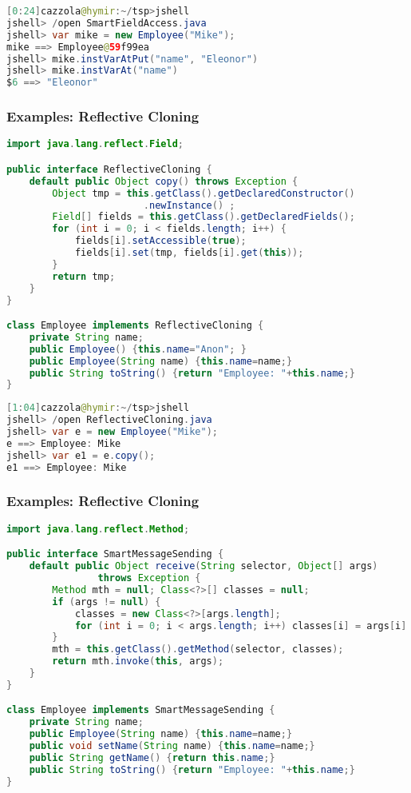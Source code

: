 \begin{lstlisting}[language=Java]
[0:24]cazzola@hymir:~/tsp>jshell
jshell> /open SmartFieldAccess.java
jshell> var mike = new Employee("Mike");
mike ==> Employee@59f99ea
jshell> mike.instVarAtPut("name", "Eleonor")
jshell> mike.instVarAt("name")
$6 ==> "Eleonor"
\end{lstlisting}

\subsubsection{Examples: Reflective Cloning}

\begin{lstlisting}[language=Java]
import java.lang.reflect.Field;

public interface ReflectiveCloning {
	default public Object copy() throws Exception {
		Object tmp = this.getClass().getDeclaredConstructor()
						.newInstance() ;
		Field[] fields = this.getClass().getDeclaredFields();
		for (int i = 0; i < fields.length; i++) {
			fields[i].setAccessible(true);
			fields[i].set(tmp, fields[i].get(this));
		}
		return tmp;
	}
}

class Employee implements ReflectiveCloning {
	private String name;
	public Employee() {this.name="Anon"; }
	public Employee(String name) {this.name=name;}
	public String toString() {return "Employee: "+this.name;}
}
\end{lstlisting}

\begin{lstlisting}[language=Java]
[1:04]cazzola@hymir:~/tsp>jshell
jshell> /open ReflectiveCloning.java
jshell> var e = new Employee("Mike");
e ==> Employee: Mike
jshell> var e1 = e.copy();
e1 ==> Employee: Mike
\end{lstlisting}

\subsubsection{Examples: Reflective Cloning}

\begin{lstlisting}[language=Java]
import java.lang.reflect.Method;

public interface SmartMessageSending {
	default public Object receive(String selector, Object[] args)
				throws Exception {
		Method mth = null; Class<?>[] classes = null;
		if (args != null) {
			classes = new Class<?>[args.length];
			for (int i = 0; i < args.length; i++) classes[i] = args[i].getClass();
		}
		mth = this.getClass().getMethod(selector, classes);
		return mth.invoke(this, args);
	}
}

class Employee implements SmartMessageSending {
	private String name;
	public Employee(String name) {this.name=name;}
	public void setName(String name) {this.name=name;}
	public String getName() {return this.name;}
	public String toString() {return "Employee: "+this.name;}
}
\end{lstlisting}


